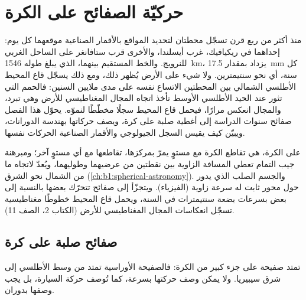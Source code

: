 \chapter{حركيّة الصفائح على الكرة}\label{ch:b1:plate-kinematics}

منذ أكثر من ربع قرن تسجّل محطتان لتحديد المواقع بالأقمار الصناعية موقعهما كل يوم: إحداهما في ريكيافيك، غرب أيسلندا، والأخرى قرب ستافانغر على الساحل الغربي للنرويج. والخط المستقيم بينهما، الذي يبلغ طوله \qty{1546}{km}، يزداد بمقدار \qty{17.5}{mm} كل سنة، أي نحو سنتيمترين. ولا شيء على الأرض يُظهر ذلك، ومع ذلك يسجّل قاع المحيط الأطلسي الشمالي بين المحطتين الاتساع نفسه على مدى ملايين السنين: فالحمم التي تثور عند الحيد الأطلسي الأوسط تأخذ اتجاه المجال المغناطيسي للأرض وهي تبرد، والمجال انعكس مرارًا، فيحمل قاع المحيط سجلًا مخطّطًا لنموّه. يحوّل هذا الفصل صفائح سنوات الدراسة إلى أغطية صلبة على كرة، ويصف حركاتها بهندسة الدورانات، ويبيّن كيف يقيس السجل الجيولوجي والأقمار الصناعية الحركات نفسها.

\begin{recall}
على الكرة،  هي تقاطع الكرة مع مستوٍ يمرّ بمركزها،  تقاطعها مع أي مستوٍ آخر؛ ومبرهنة جيب التمام تعطي المسافة الزاوية بين نقطتين من عرضيهما وطوليهما، ويُعدّ  لاتجاه ما من الشمال نحو الشرق (\cref{ch:b1:spherical-astronomy}). والجسم الصلب الذي يدور حول محور ثابت له سرعة زاوية (الفيزياء). ويتجزّأ  إلى صفائح تتحرّك بعضها بالنسبة إلى بعض بسرعات بضعة سنتيمترات في السنة، ويحمل قاع المحيط خطوطًا مغناطيسية تسجّل انعكاسات المجال المغناطيسي للأرض (الكتاب 2، الصف 11).
\end{recall}

\section{صفائح صلبة على كرة}

تمتد صفيحة على جزء كبير من الكرة: فالصفيحة الأوراسية تمتد من وسط الأطلسي إلى شرق سيبيريا. ولا يمكن وصف حركتها بسرعة، كما تُوصف حركة السيارة، بل يجب وصفها بدوران.

